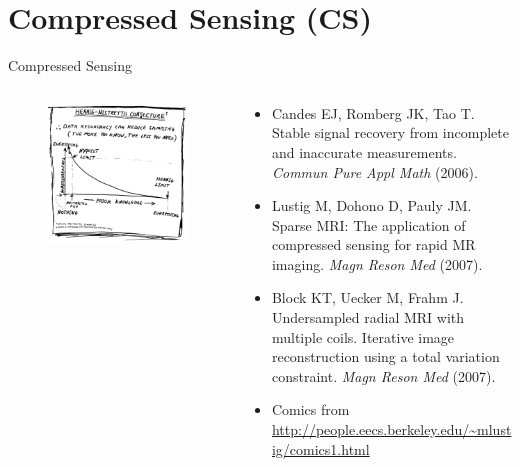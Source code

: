 \section{Compressed Sensing (CS)}

\begin{frame}{Compressed Sensing}

	\begin{columns}
		\begin{column}{0.45\textwidth}
			\begin{figure}
				\includegraphics[width=\columnwidth]{fig/comics_02.png}
			\end{figure}
		\end{column}
	
		\begin{column}{0.55\textwidth}
			\begin{itemize}
				\item Candes EJ, Romberg JK, Tao T. Stable signal recovery from incomplete and inaccurate measurements. \textit{Commun Pure Appl Math} (2006).
				\vspace{0.5em}
				\item Lustig M, Dohono D, Pauly JM. Sparse MRI: The application of compressed sensing for rapid MR imaging. \textit{Magn Reson Med} (2007).
				\vspace{0.5em}
				\item Block KT, Uecker M, Frahm J. Undersampled radial MRI with multiple coils. Iterative image reconstruction using a total variation constraint. \textit{Magn Reson Med} (2007).
				\vspace{0.5em}
				\item Comics from \url{http://people.eecs.berkeley.edu/~mlustig/comics1.html}
			\end{itemize}
			\vfill
		\end{column}
	\end{columns}
\end{frame}


